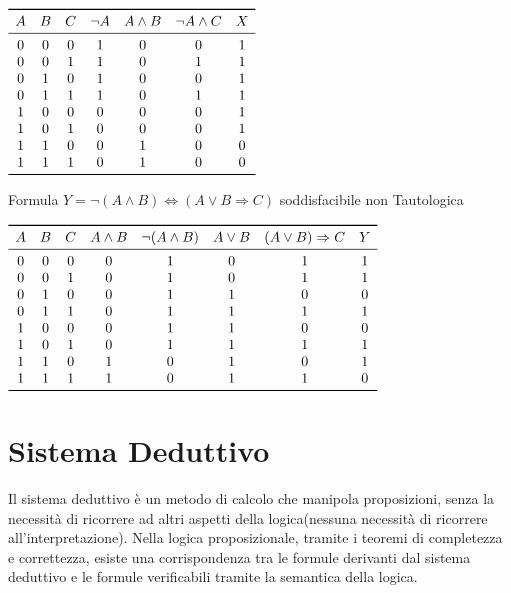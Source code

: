 \begin{enumerate}
$\begin{array}{ccccccc}
\toprule A & B & C & \neg A & A \land B & \neg A \land C & X\\
\midrule
         0 & 0 & 0 & 1 & 0 & 0 & 1 \\
         0 & 0 & 1 & 1 & 0 & 1 & 1 \\
         0 & 1 & 0 & 1 & 0 & 0 & 1 \\
         0 & 1 & 1 & 1 & 0 & 1 & 1 \\
         1 & 0 & 0 & 0 & 0 & 0 & 1 \\
         1 & 0 & 1 & 0 & 0 & 0 & 1 \\
         1 & 1 & 0 & 0 & 1 & 0 & 0 \\
         1 & 1 & 1 & 0 & 1 & 0 & 0 \\
\bottomrule
\end{array}$ \newline

Formula $Y = \neg(A \land B) \iff (A \lor B \Rightarrow C)$ soddisfacibile non Tautologica

$\begin{array}{cccccccc}
\toprule
A & B & C & A \land B & \neg(A \land B) & A \lor B & (A \lor B) \Rightarrow C & Y \\
\midrule
0 & 0 & 0 & 0 & 1 & 0 & 1 & 1 \\
0 & 0 & 1 & 0 & 1 & 0 & 1 & 1 \\
0 & 1 & 0 & 0 & 1 & 1 & 0 & 0 \\
0 & 1 & 1 & 0 & 1 & 1 & 1 & 1 \\
1 & 0 & 0 & 0 & 1 & 1 & 0 & 0 \\
1 & 0 & 1 & 0 & 1 & 1 & 1 & 1 \\
1 & 1 & 0 & 1 & 0 & 1 & 0 & 1 \\
1 & 1 & 1 & 1 & 0 & 1 & 1 & 0 \\
\bottomrule
\end{array}$

\section{Sistema Deduttivo}
Il sistema deduttivo è un metodo di calcolo che manipola proposizioni, senza la
necessità di ricorrere ad altri aspetti della logica(nessuna necessità di ricorrere all'interpretazione).\newline
Nella logica proposizionale, tramite i teoremi di completezza e correttezza, esiste
una corrispondenza tra le formule derivanti dal sistema deduttivo e le formule verificabili
tramite la semantica della logica.


\end{enumerate}
